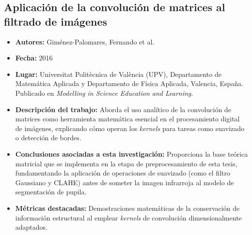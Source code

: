 \subsection{Aplicación de la convolución de matrices al filtrado de imágenes}
\begin{itemize}
	\item \textbf{Autores:} Giménez-Palomares, Fernando et al. \cite{gimenez2016aplicacion}
	\item \textbf{Fecha:} 2016
	\item \textbf{Lugar:} Universitat Politècnica de València (UPV), Departamento de Matemática Aplicada y Departamento de Física Aplicada, Valencia, España. Publicado en \textit{Modelling in Science Education and Learning}.
	\item \textbf{Descripción del trabajo:} Aborda el uso analítico de la convolución de matrices como herramienta matemática esencial en el procesamiento digital de imágenes, explicando cómo operan los \textit{kernels} para tareas como suavizado o detección de bordes.
	\item \textbf{Conclusiones asociadas a esta investigación:} Proporciona la base teórica matricial que se implementa en la etapa de preprocesamiento de esta tesis, fundamentando la aplicación de operaciones de suavizado (como el filtro Gaussiano y CLAHE) antes de someter la imagen infrarroja al modelo de segmentación de pupila.
	\item \textbf{Métricas destacadas:} Demostraciones matemáticas de la conservación de información estructural al emplear \textit{kernels} de convolución dimensionalmente adaptados.
\end{itemize}

